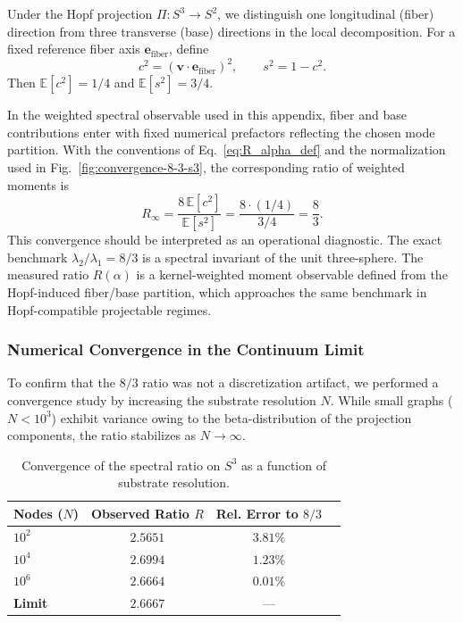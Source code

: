     Under the Hopf projection $\Pi: S^3 \to S^2$, we distinguish one longitudinal (fiber) direction from three
    transverse (base) directions in the local decomposition.
    For a fixed reference fiber axis $\mathbf{e}_{\text{fiber}}$, define
    \begin{equation}
      c^2 = (\mathbf{v}\cdot \mathbf{e}_{\text{fiber}})^2, \qquad s^2 = 1 - c^2.
    \end{equation}
    Then $\mathbb{E}[c^2]=1/4$ and $\mathbb{E}[s^2]=3/4$.

    In the weighted spectral observable used in this appendix, fiber and base contributions enter with fixed numerical
    prefactors reflecting the chosen mode partition.
    With the conventions of Eq.~\eqref{eq:R_alpha_def} and the normalization used in Fig.~\ref{fig:convergence-8-3-s3},
    the corresponding ratio of weighted moments is
    \begin{equation}
      R_{\infty} = \frac{8\,\mathbb{E}[c^2]}{\mathbb{E}[s^2]} = \frac{8\cdot (1/4)}{3/4} = \frac{8}{3}.
    \end{equation}
    This convergence should be interpreted as an operational diagnostic.
    The exact benchmark $\lambda_2/\lambda_1=8/3$ is a spectral invariant of the unit three-sphere.
    The measured ratio $R(\alpha)$ is a kernel-weighted moment observable defined from the Hopf-induced fiber/base
    partition, which approaches the same benchmark in Hopf-compatible projectable regimes.

  \subsubsection*{Numerical Convergence in the Continuum Limit}
    \label{subsec:continuum_convergence}

    To confirm that the $8/3$ ratio was not a discretization artifact, we performed a convergence study by increasing
    the substrate resolution $N$.
    While small graphs ($N < 10^3$) exhibit variance owing to the beta-distribution of the projection components,
    the ratio stabilizes as $N \to \infty$.

    \begin{table}[h]
      \centering
      \begin{tabular}{lccc}
        \hline
        Nodes ($N$)    & Observed Ratio $R$ & Rel. Error to $8/3$ \\
        \hline
        $10^2$         & $2.5651$           & $3.81\%$            \\
        $10^4$         & $2.6994$           & $1.23\%$            \\
        $10^6$         & $\mathbf{2.6664}$  & $\mathbf{0.01\%}$   \\
        \hline
        \textbf{Limit} & $\mathbf{2.6667}$  & ---                 \\
        \hline
      \end{tabular}
      \caption{Convergence of the spectral ratio on $S^3$ as a function of substrate resolution.}
      \label{tab:convergence}
    \end{table}

